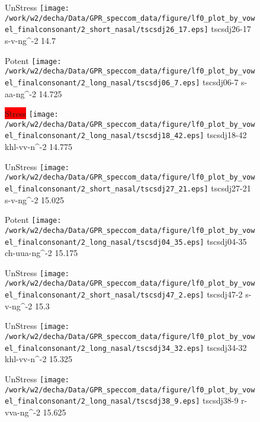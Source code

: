 \documentclass{article}
\begin{document}
\begin{figure}[t]
\begin{minipage}[b]{.24\textwidth}
UnStress
\centering
\texttt{[image: /work/w2/decha/Data/GPR\_speccom\_data/figure/lf0\_plot\_by\_vowel\_finalconsonant/2\_short\_nasal/tscsdj26\_17.eps]}
tscsdj26-17 s-v-ng\textasciicircum-2 14.7
\end{minipage}
\begin{minipage}[b]{.24\textwidth}
\colorbox{Apricot}{Potent}
\centering
\texttt{[image: /work/w2/decha/Data/GPR\_speccom\_data/figure/lf0\_plot\_by\_vowel\_finalconsonant/2\_long\_nasal/tscsdj06\_7.eps]}
tscsdj06-7 s-aa-ng\textasciicircum-2 14.725
\end{minipage}
\begin{minipage}[b]{.24\textwidth}
\colorbox{red}{Stress}
\centering
\texttt{[image: /work/w2/decha/Data/GPR\_speccom\_data/figure/lf0\_plot\_by\_vowel\_finalconsonant/2\_long\_nasal/tscsdj18\_42.eps]}
tscsdj18-42 khl-vv-n\textasciicircum-2 14.775
\end{minipage}
\begin{minipage}[b]{.24\textwidth}
UnStress
\centering
\texttt{[image: /work/w2/decha/Data/GPR\_speccom\_data/figure/lf0\_plot\_by\_vowel\_finalconsonant/2\_short\_nasal/tscsdj27\_21.eps]}
tscsdj27-21 s-v-ng\textasciicircum-2 15.025
\end{minipage}
\end{figure}

\begin{figure}[t]
\begin{minipage}[b]{.24\textwidth}
\colorbox{Apricot}{Potent}
\centering
\texttt{[image: /work/w2/decha/Data/GPR\_speccom\_data/figure/lf0\_plot\_by\_vowel\_finalconsonant/2\_long\_nasal/tscsdj04\_35.eps]}
tscsdj04-35 ch-uua-ng\textasciicircum-2 15.175
\end{minipage}
\begin{minipage}[b]{.24\textwidth}
UnStress
\centering
\texttt{[image: /work/w2/decha/Data/GPR\_speccom\_data/figure/lf0\_plot\_by\_vowel\_finalconsonant/2\_short\_nasal/tscsdj47\_2.eps]}
tscsdj47-2 s-v-ng\textasciicircum-2 15.3
\end{minipage}
\begin{minipage}[b]{.24\textwidth}
UnStress
\centering
\texttt{[image: /work/w2/decha/Data/GPR\_speccom\_data/figure/lf0\_plot\_by\_vowel\_finalconsonant/2\_long\_nasal/tscsdj34\_32.eps]}
tscsdj34-32 khl-vv-n\textasciicircum-2 15.325
\end{minipage}
\begin{minipage}[b]{.24\textwidth}
UnStress
\centering
\texttt{[image: /work/w2/decha/Data/GPR\_speccom\_data/figure/lf0\_plot\_by\_vowel\_finalconsonant/2\_long\_nasal/tscsdj38\_9.eps]}
tscsdj38-9 r-vva-ng\textasciicircum-2 15.625
\end{minipage}
\end{figure}
\end{document}

